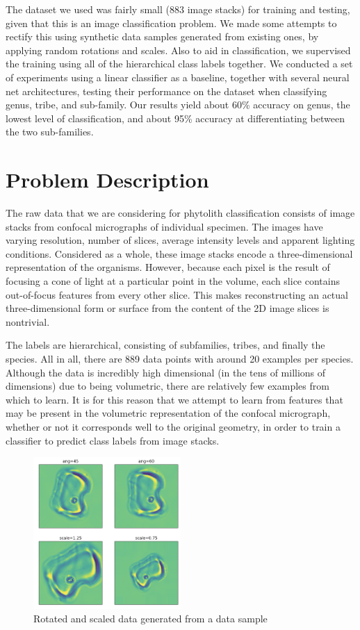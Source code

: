 \documentclass{article}
\begin{document}
The dataset we used was fairly small (883 image stacks) for training and testing, given that this is an image classification problem. We made some attempts to rectify this using synthetic data samples generated from existing ones, by applying random rotations and scales. Also to aid in classification, we supervised the training using all of the hierarchical class labels together. We conducted a set of experiments using a linear classifier as a baseline, together with several neural net architectures, testing their performance on the dataset when classifying genus, tribe, and sub-family. Our results yield about 60\% accuracy on genus, the lowest level of classification, and about 95\% accuracy at differentiating between the two sub-families.

\section{Problem Description}

The raw data that we are considering for phytolith classification consists of image stacks from confocal micrographs of individual specimen. The images have varying resolution, number of slices, average intensity levels and apparent lighting conditions. Considered as a whole, these image stacks encode a three-dimensional representation of the organisms. However, because each pixel is the result of focusing a cone of light at a particular point in the volume, each slice contains out-of-focus features from every other slice. This makes reconstructing an actual three-dimensional form or surface from the content of the 2D image slices is nontrivial.

The labels are hierarchical, consisting of subfamilies, tribes, and finally the species. All in all, there are 889 data points with around 20 examples per species. Although the data is incredibly high dimensional (in the tens of millions of dimensions) due to being volumetric, there are relatively few examples from which to learn. It is for this reason that we attempt to learn from features that may be present in the volumetric representation of the confocal micrograph, whether or not it corresponds well to the original geometry, in order to train a classifier to predict class labels from image stacks.

\begin{figure}
	\centering
		\includegraphics[width=0.5\textwidth]{rotations}
	\caption{Rotated and scaled data generated from a data sample}
	\label{fig:rotated}
\end{figure}
\end{document}
